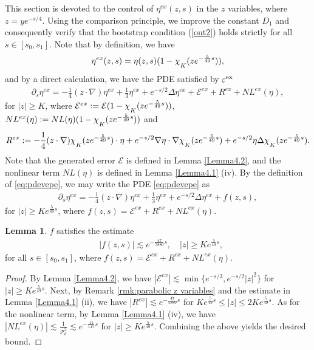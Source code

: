 \documentclass[11pt,reqno]{amsart}
\theoremstyle{definition}
\theoremstyle{bfremark}
\newtheorem{lemma}{Lemma}[section]
\numberwithin{equation}{section}
\newcommand{\vepe}{\varepsilon^{\textup{ex}}}
\newcommand{\mchi}{\raisebox{0pt}[1ex][1ex]{$\chi$}}
\begin{document}
\label{subsec:vepe}
This section is devoted to the control of \(\eta^{ex}(z,s)\) in the \(z\) variables, where \(z=ye^{-s/4}\). Using the comparison principle, we improve the constant \(D_1\) and consequently verify that the bootstrap condition (\ref{out2}) holds strictly for all \(s \in [s_0,s_1]\). Note that by definition, we have
\begin{align*}
    \eta^{ex}(z,s)=\eta(z,s)(1-\mchi_{K}(ze^{-\frac{5}{49}s})),
\end{align*}
and by a direct calculation, we have the PDE satisfied by \(\vepe\)
\begin{align}
\label{eq:pdevepe}
    \partial_s \eta^{ex}=-\frac{1}{4}(z \cdot \nabla)\eta^{ex}+\frac{1}{3} \eta^{ex}+e^{-s/2}\Delta \eta^{ex}+\mathcal{E}^{ex}+R^{ex}+NL^{ex}(\eta),
\end{align}
for \(|z| \geq K\), where \(\mathcal{E}^{ex}:=\mathcal{E}(1-\mchi_{K}(ze^{-\frac{5}{49}s}))\), \(NL^{ex}(\eta):=NL(\eta)(1-\mchi_{K}(ze^{-\frac{5}{49}s}))\) and 
\begin{align*}
    R^{ex}:=-\frac{1}{4}(z \cdot \nabla)\mchi_{K}(ze^{-\frac{5}{49}s}) \cdot \eta+e^{-s/2}\nabla \eta \cdot \nabla \mchi_K(ze^{-\frac{5}{49}s})+e^{-s/2} \eta \Delta \mchi_K(ze^{-\frac{5}{49}s}).
\end{align*}
Note that the generated error \(\mathcal{E}\) is defined in Lemma \ref{Lemma4.2}, and the nonlinear term \(NL(\eta)\) is defined in Lemma \ref{Lemma4.1} (iv). By the definition of \ref{eq:pdevepe}, we may write the PDE \ref{eq:pdevepe} as
\begin{align*}
    \partial_s \eta^{ex}=-\frac{1}{4}(z \cdot \nabla)\eta^{ex}+\frac{1}{3}\eta^{ex}+e^{-s/2}\Delta \eta^{ex}+f(z,s),
\end{align*}
for \(|z| \geq Ke^{\frac{5}{49}s}\), where \(f(z,s)=\mathcal{E}^{ex}+R^{ex}+NL^{ex}(\eta)\).

\begin{lemma}
\label{lem:estmf}
    \(f\) satisfies the estimate
    \begin{align*}
    &|f(z,s)| \lesssim e^{-\frac{47}{5880}s}, \quad |z| \geq Ke^{\frac{5}{49}s},
    \end{align*}
    for all \(s \in [s_0,s_1]\), where \(f(z,s)=\mathcal{E}^{ex}+R^{ex}+NL^{ex}(\eta)\).
\end{lemma}
\begin{proof}
    By Lemma \ref{Lemma4.2}, we have \(|\mathcal{E}^{ex}| \lesssim \min{\{e^{-s/3},e^{-s/2}|z|^2\}} \) for \(|z| \geq Ke^{\frac{5}{49}s}\). Next, by Remark \ref{rmk:parabolic z variables} and the estimate in Lemma \ref{Lemma4.1} (ii), we have \(|R^{ex}| \lesssim e^{-\frac{47}{5880}s}\) for \(Ke^{\frac{5}{49}s} \leq|z| \leq 2Ke^{\frac{5}{49}s}\). As for the nonlinear term, by Lemma \ref{Lemma4.1} (iv), we have \(|NL^{ex}(\eta)| \lesssim \frac{1}{\mathcal{P}_{\theta}^2} \lesssim e^{-\frac{11}{147}s}\) for \(|z| \geq Ke^{\frac{5}{49}s}\). Combining the above yields the desired bound.
\end{proof}
\end{document}
